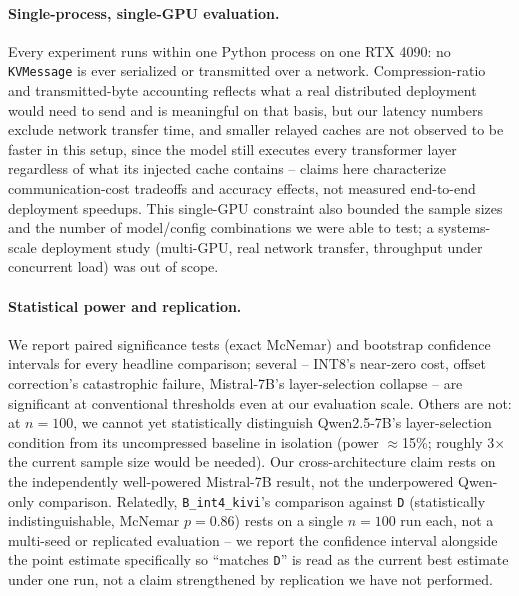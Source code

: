 \documentclass[11pt]{article}
\begin{document}
\paragraph{Single-process, single-GPU evaluation.} Every experiment runs
within one Python process on one RTX 4090: no \texttt{KVMessage} is ever
serialized or transmitted over a network. Compression-ratio and
transmitted-byte accounting reflects what a real distributed deployment
would need to send and is meaningful on that basis, but our latency
numbers exclude network transfer time, and smaller relayed caches are not
observed to be faster in this setup, since the model still executes every
transformer layer regardless of what its injected cache contains -- claims
here characterize communication-cost tradeoffs and accuracy effects, not
measured end-to-end deployment speedups. This single-GPU constraint also
bounded the sample sizes and the number of model/config combinations we
were able to test; a systems-scale deployment study (multi-GPU, real
network transfer, throughput under concurrent load) was out of scope.

\paragraph{Statistical power and replication.} We report paired
significance tests (exact McNemar) and bootstrap confidence intervals for
every headline comparison; several -- INT8's near-zero cost, offset
correction's catastrophic failure, Mistral-7B's layer-selection collapse
-- are significant at conventional thresholds even at our evaluation
scale. Others are not: at $n=100$, we cannot yet statistically distinguish
Qwen2.5-7B's layer-selection condition from its uncompressed baseline in
isolation (power $\approx$15\%; roughly 3$\times$ the current sample size
would be needed). Our cross-architecture claim rests on the independently
well-powered Mistral-7B result, not the underpowered Qwen-only
comparison. Relatedly, \texttt{B\_int4\_kivi}'s comparison against
\texttt{D} (statistically indistinguishable, McNemar $p=0.86$) rests on a
single $n=100$ run each, not a multi-seed or replicated evaluation -- we
report the confidence interval alongside the point estimate specifically
so ``matches \texttt{D}'' is read as the current best estimate under one
run, not a claim strengthened by replication we have not performed.
\end{document}
